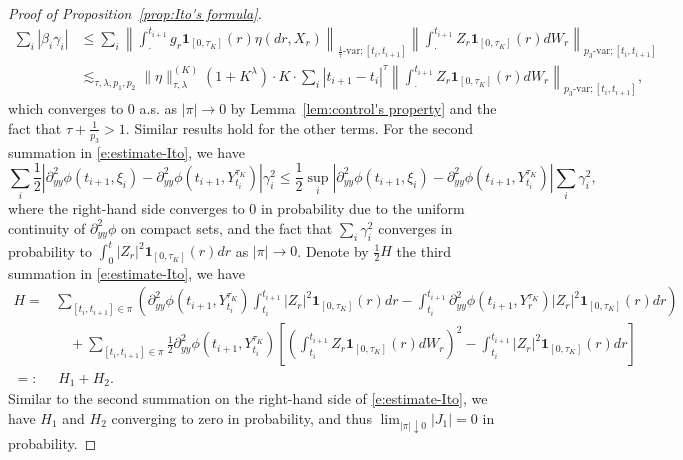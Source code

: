 \documentclass[10pt,a4paper]{amsart}
\begin{document}
\begin{proof}[Proof of Proposition~\ref{prop:Ito's formula}]
\begin{align*}
\sum_{i}\left|\beta_i \gamma_i\right|		& \le \sum\limits_{i}\left\|\int_{\cdot}^{t_{i+1}}g_{r}\mathbf{1}_{[0,\tau_{K}]}(r)\eta(dr,X_{r})\right\|_{\frac{1}{\tau}\text{-var};[t_{i},t_{i+1}]} \left\|\int_{\cdot}^{t_{i+1}}Z_{r}\mathbf{1}_{[0,\tau_{K}]}(r)dW_{r}\right\|_{p_{3}\text{-var};[t_{i},t_{i+1}]}\\
&\lesssim_{\tau,\lambda,p_{1},p_{2}}\|\eta\|^{(K)}_{\tau,\lambda}(1+K^{\lambda})\cdot K\cdot \sum_{i}|t_{i+1}-t_{i}|^{\tau}\left\|\int_{\cdot}^{t_{i+1}}Z_{r}\mathbf{1}_{[0,\tau_{K}]}(r)dW_{r}\right\|_{p_{3}\text{-var};[t_{i},t_{i+1}]},
\end{align*}
which converges to 0 a.s. as $|\pi|\to 0$ by Lemma~\ref{lem:control's property} and the fact that $\tau + \frac{1}{p_{3}} > 1$. Similar results hold for the other terms. For the second summation in \eqref{e:estimate-Ito}, we have	
\begin{equation*}
\sum_{i}\frac{1}{2}\left|\partial^{2}_{yy}\phi(t_{i+1},\xi_{i}) - \partial^{2}_{yy}\phi(t_{i+1},Y^{\tau_K}_{t_{i}})\right|\gamma_i^{2}\le \frac{1}{2}\sup_{i}\left|\partial^{2}_{yy}\phi(t_{i+1},\xi_{i})-\partial^{2}_{yy}\phi(t_{i+1},Y^{\tau_K}_{t_{i}})\right| \sum_{i}\gamma_i^{2},
\end{equation*}
where the right-hand side converges to 0 in probability due to the uniform continuity of $\partial^2_{yy}\phi$ on compact sets, 
and the fact that $\sum_{i}\gamma_i^{2}$ converges in probability  to $\int_{0}^{t} |Z_{r}|^{2}\mathbf{1}_{[0,\tau_{K}]}(r) dr$ as $|\pi|\to0$.
Denote by $\frac12H$ the third summation in \eqref{e:estimate-Ito}, we have 
\begin{align*}
H =& \sum_{[t_{i},t_{i+1}]\in\pi}\left(\partial^{2}_{yy}\phi(t_{i+1},Y^{\tau_{K}}_{t_{i}}) \int_{t_{i}}^{t_{i+1}}|Z_{r}|^{2}\mathbf{1}_{[0,\tau_{K}]}(r)dr - \int_{t_{i}}^{t_{i+1}}\partial^{2}_{yy}\phi(t_{i+1},Y^{\tau_{K}}_{r})|Z_{r}|^{2}\mathbf{1}_{[0,\tau_{K}]}(r)dr\right)	\\
&\quad + \sum\limits_{[t_{i},t_{i+1}]\in\pi}\frac{1}{2} \partial^{2}_{yy}\phi(t_{i+1},Y^{\tau_{K}}_{t_{i}}) \left[\left(\int_{t_{i}}^{t_{i+1}}Z_{r}\mathbf{1}_{[0,\tau_{K}]}(r)dW_{r}\right)^{2} - \int_{t_{i}}^{t_{i+1}}|Z_{r}|^{2}\mathbf{1}_{[0,\tau_{K}]}(r)dr\right]\\[1mm]
=: & \ H_{1} + H_{2}.
\end{align*}
Similar to the second summation on the right-hand side of \eqref{e:estimate-Ito}, we have $H_1$ and $H_2$ converging to zero in probability, and thus $\lim_{|\pi|\downarrow 0}|J_1| = 0$ in probability.


\end{proof}
\end{document}
